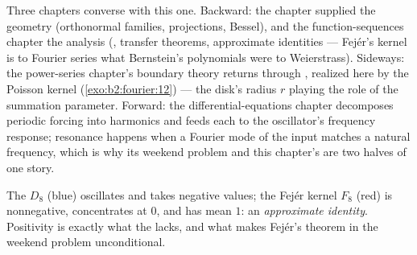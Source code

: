 \begin{remark}
Three chapters converse with this one. Backward: the 
chapter supplied the geometry (orthonormal families,
projections, Bessel), and the function-sequences chapter the
analysis (, transfer theorems, approximate
identities --- Fej\'er's kernel is to Fourier series what
Bernstein's polynomials were to Weierstrass). Sideways: the
power-series chapter's boundary theory returns through , realized here by the Poisson kernel
(\cref{exo:b2:fourier:12}) --- the disk's radius $r$ playing
the role of the summation parameter. Forward: the
differential-equations chapter decomposes periodic forcing
into harmonics and feeds each to the oscillator's frequency
response; resonance happens when a Fourier mode of the input
matches a natural frequency, which is why its weekend problem
and this chapter's are two halves of one story.
\end{remark}

\begin{omfigure}

{\small The  $D_8$ (blue) oscillates and takes
negative values; the Fej\'er kernel $F_8$ (red) is nonnegative,
concentrates at $0$, and has mean $1$: an \emph{approximate
identity}. Positivity is exactly what the 
lacks, and what makes Fej\'er's theorem in the weekend problem
unconditional.}
\end{omfigure}

